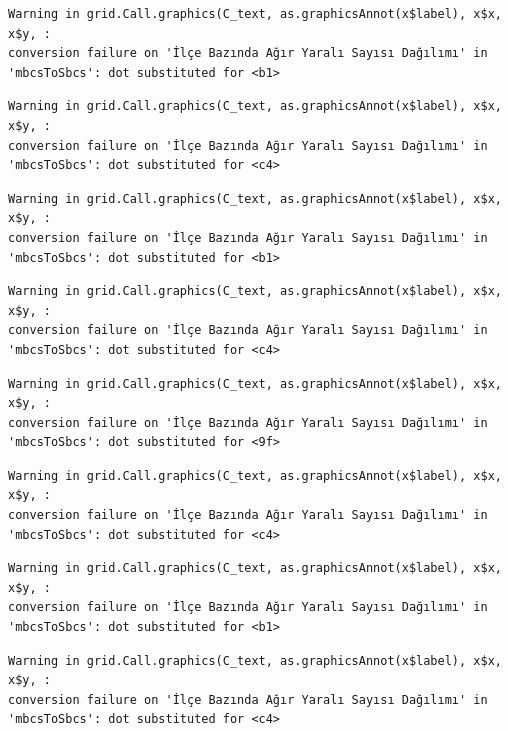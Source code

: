 \documentclass[
  11pt,
  a4paper,
  DIV=11,
  numbers=noendperiod]{scrartcl}
\begin{document}
\begin{verbatim}
Warning in grid.Call.graphics(C_text, as.graphicsAnnot(x$label), x$x, x$y, :
conversion failure on 'İlçe Bazında Ağır Yaralı Sayısı Dağılımı' in
'mbcsToSbcs': dot substituted for <b1>
\end{verbatim}

\begin{verbatim}
Warning in grid.Call.graphics(C_text, as.graphicsAnnot(x$label), x$x, x$y, :
conversion failure on 'İlçe Bazında Ağır Yaralı Sayısı Dağılımı' in
'mbcsToSbcs': dot substituted for <c4>
\end{verbatim}

\begin{verbatim}
Warning in grid.Call.graphics(C_text, as.graphicsAnnot(x$label), x$x, x$y, :
conversion failure on 'İlçe Bazında Ağır Yaralı Sayısı Dağılımı' in
'mbcsToSbcs': dot substituted for <b1>
\end{verbatim}

\begin{verbatim}
Warning in grid.Call.graphics(C_text, as.graphicsAnnot(x$label), x$x, x$y, :
conversion failure on 'İlçe Bazında Ağır Yaralı Sayısı Dağılımı' in
'mbcsToSbcs': dot substituted for <c4>
\end{verbatim}

\begin{verbatim}
Warning in grid.Call.graphics(C_text, as.graphicsAnnot(x$label), x$x, x$y, :
conversion failure on 'İlçe Bazında Ağır Yaralı Sayısı Dağılımı' in
'mbcsToSbcs': dot substituted for <9f>
\end{verbatim}

\begin{verbatim}
Warning in grid.Call.graphics(C_text, as.graphicsAnnot(x$label), x$x, x$y, :
conversion failure on 'İlçe Bazında Ağır Yaralı Sayısı Dağılımı' in
'mbcsToSbcs': dot substituted for <c4>
\end{verbatim}

\begin{verbatim}
Warning in grid.Call.graphics(C_text, as.graphicsAnnot(x$label), x$x, x$y, :
conversion failure on 'İlçe Bazında Ağır Yaralı Sayısı Dağılımı' in
'mbcsToSbcs': dot substituted for <b1>
\end{verbatim}

\begin{verbatim}
Warning in grid.Call.graphics(C_text, as.graphicsAnnot(x$label), x$x, x$y, :
conversion failure on 'İlçe Bazında Ağır Yaralı Sayısı Dağılımı' in
'mbcsToSbcs': dot substituted for <c4>
\end{verbatim}
\end{document}
